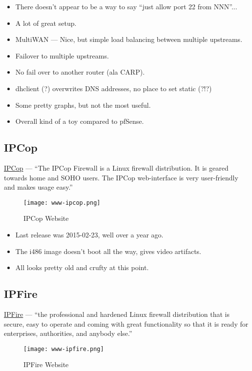 \begin{itemize}
 \item There doesn't appear to be a way to say ``just allow port 22 from NNN''...
 \item A lot of great setup.
 \item MultiWAN --- Nice, but simple load balancing between multiple upstreams.
 \item Failover to multiple upstreams.
 \item No fail over to another router (ala CARP).
 \item dhclient (?) overwrites DNS addresses, no place to set static (?!?)
 \item Some pretty graphs, but not the most useful.
 \item Overall kind of a toy compared to pfSense.
\end{itemize}


\subsection{IPCop}
\href{http://www.ipcop.org/}{IPCop} --- ``The IPCop Firewall is a Linux firewall distribution. It is geared towards home and SOHO users. The IPCop web-interface is very user-friendly and makes usage easy.''

\begin{figure}[h!]
\texttt{[image: www-ipcop.png]}
 \caption{IPCop Website}
 \label{fig:www-ipcop}
\end{figure}


\begin{itemize}
 \item Last release was 2015-02-23, well over a year ago.
 \item The i486 image doesn't boot all the way, gives video artifacts.
 \item All looks pretty old and crufty at this point.
\end{itemize}


\subsection{IPFire}
\href{http://www.ipfire.org/}{IPFire} --- ``the professional and hardened Linux firewall distribution that is secure, easy to operate and coming with great functionality so that it is ready for enterprises, authorities, and anybody else.''

\begin{figure}[h!]
\texttt{[image: www-ipfire.png]}
 \caption{IPFire Website}
 \label{fig:www-ipfire}
\end{figure}


